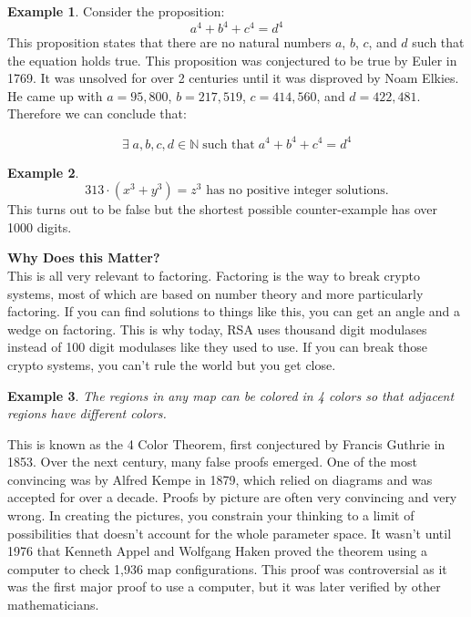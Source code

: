 \documentclass[11pt]{article}
\theoremstyle{definition}
\newtheorem{example}{Example}
\begin{document}
\begin{example}
  Consider the proposition:
  \[
  a^4 + b^4 + c^4 = d^4
  \]
  This proposition states that there are no natural numbers \(a\), \(b\), \(c\), and \(d\) such that the equation holds true. This proposition was conjectured to be true by Euler in 1769. It was unsolved for over 2 centuries until it was disproved by Noam Elkies. He came up with \( a = 95,800 \), \( b = 217,519 \), \( c = 414,560 \), and \( d = 422,481 \). Therefore we can conclude that:

  \[
  \exists \; a, b, c, d \in \mathbb{N} \; \text{such that} \; a^4 + b^4 + c^4 = d^4
  \]
\end{example}

\begin{example}
  \[
  313 \cdot (x^3 + y^3) = z^3 \text{ has no positive integer solutions.}
  \]
  This turns out to be false but the shortest possible counter-example has over 1000 digits.
  \vspace{.5cm}
  
  \textbf{Why Does this Matter?} \\
  This is all very relevant to factoring. Factoring is the way to break crypto systems, most of which are based on number theory and more particularly factoring. If you can find solutions to things like this, you can get an angle and a wedge on factoring. This is why today, RSA uses thousand digit modulases instead of 100 digit modulases like they used to use. If you can break those crypto systems, you can't rule the world but you get close.
\end{example}

\begin{example}
\textit{The regions in any map can be colored in 4 colors so that adjacent regions have different colors.}
\vspace{.5cm}

This is known as the 4 Color Theorem, first conjectured by Francis Guthrie in 1853. Over the next century, many false proofs emerged. One of the most convincing was by Alfred Kempe in 1879, which relied on diagrams and was accepted for over a decade. Proofs by picture are often very convincing and very wrong. In creating the pictures, you constrain your thinking to a limit of possibilities that doesn't account for the whole parameter space. It wasn't until 1976 that Kenneth Appel and Wolfgang Haken proved the theorem using a computer to check 1,936 map configurations. This proof was controversial as it was the first major proof to use a computer, but it was later verified by other mathematicians.
\end{example}
\end{document}
